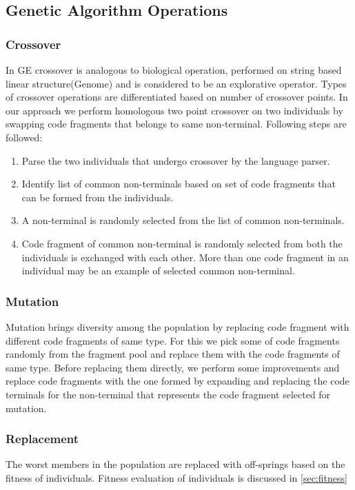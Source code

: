 \documentclass{sig-alternate}
\begin{document}
\subsection{Genetic Algorithm Operations}
\subsubsection{Crossover}
\indent In GE crossover is analogous to biological operation, performed on string based linear structure(Genome) and is considered to be an explorative operator. Types of crossover operations are differentiated based on number of crossover points. In our approach we perform  homologous two point crossover on two individuals by swapping code fragments that belongs to same non-terminal. Following steps are followed:
\begin{enumerate}
\item Parse the two individuals that undergo crossover by the language parser. \item Identify list of common non-terminals based on set of code fragments that can be formed from the individuals.
\item A non-terminal is randomly selected from the list of common non-terminals. 
\item Code fragment of common non-terminal is randomly selected from both the individuals is exchanged with each other. More than one code fragment in an individual may be an example of selected common non-terminal.
\end{enumerate}

\subsubsection{Mutation}
\indent Mutation brings diversity among the population by replacing code fragment with different code fragments of same type. For this we pick some of code fragments randomly from the fragment pool and replace them with the code fragments of same type. Before replacing them directly, we perform some improvements and replace code fragments with the one formed by expanding and replacing the code terminals for the non-terminal that represents the code fragment selected for mutation.

\subsubsection{Replacement}
\indent The worst members in the population are replaced with off-springs based on the fitness of individuals. Fitness evaluation of individuals is discussed in  \autoref{sec:fitness}
\end{document}
